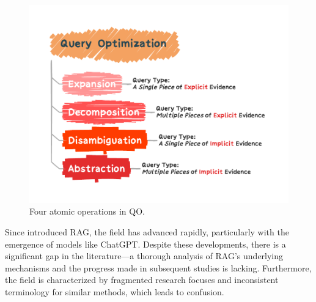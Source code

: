 \documentclass[11pt]{article}
\begin{document}
\begin{figure}
	\centering
	\includegraphics[scale=0.53]{figure/QueryOptimizationAbs.pdf}
	\caption{Four atomic operations in QO.}
	\label{intro}
\end{figure}

Since \citet{2020rag} introduced RAG, the field has advanced rapidly, particularly with the emergence of models like ChatGPT. Despite these developments, there is a significant gap in the literature—a thorough analysis of RAG's underlying mechanisms and the progress made in subsequent studies is lacking. Furthermore, the field is characterized by fragmented research focuses and inconsistent terminology for similar methods, which leads to confusion.
\end{document}

